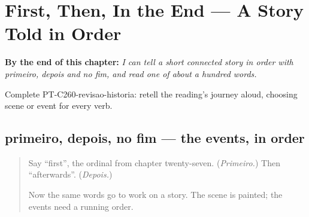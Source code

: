 
\chapter{First, Then, In the End --- A Story Told in Order}
\label{ch:pt-a-story-told-in-order}

\begin{chapteropening}
\textbf{By the end of this chapter:} \emph{I can tell a short connected story in order with primeiro, depois and no fim, and read one of about a hundred words.}

Complete PT-C260-revisao-historia: retell the reading's journey aloud, choosing scene or event for every verb.
\end{chapteropening}

\section[primeiro, depois, no fim]{primeiro, depois, no fim — the events, in order}

\label{lesson:PT-C260-no-fim}



\begin{quote}
Say \textquotedblleft{}first\textquotedblright{}, the ordinal from chapter twenty-seven. (\emph{Primeiro.}) Then \textquotedblleft{}afterwards\textquotedblright{}. (\emph{Depois.})

Now the same words go to work on a story. The scene is painted; the events need a running order.
\end{quote}


